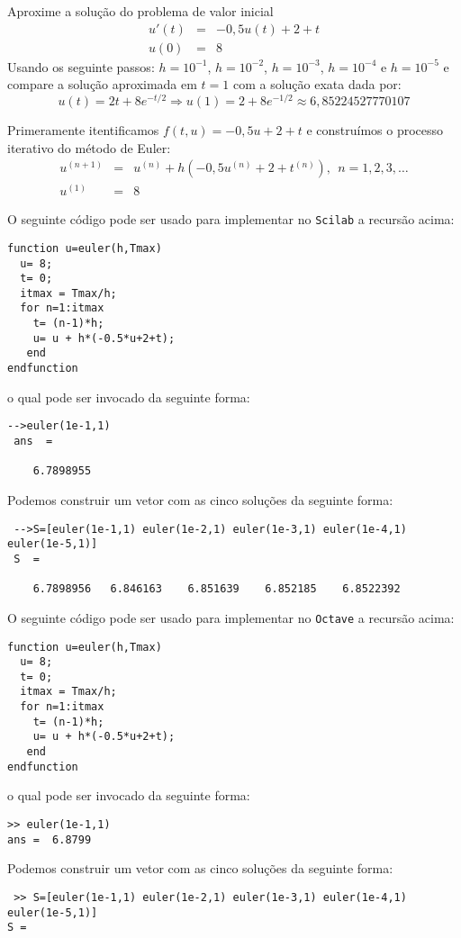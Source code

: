 \begin{exeresol}\label{pvi:exeresol1} Aproxime a solução do problema de valor inicial
\begin{eqnarray}
     u'(t)&=& -0,5u(t)+2+t\\
            u(0) &=&  8
\end{eqnarray}
Usando os seguinte passos: $h=10^{-1}$, $h=10^{-2}$, $h=10^{-3}$, $h=10^{-4}$ e $h=10^{-5}$ e compare a solução aproximada em $t=1$ com a solução exata dada por:
\begin{equation}
     u(t) = 2t+8e^{-t/2} \Longrightarrow u(1)=2+8e^{-1/2} \approx 6,85224527770107
\end{equation}
\end{exeresol}
\begin{resol} Primeramente itentificamos $f(t,u)=-0,5u+2+t$ e construímos o processo iterativo do método de Euler: 
\begin{eqnarray}
  u^{(n+1)}&=&u^{(n)} + h( -0,5u^{(n)}+2+t^{(n)}),~~n=1,2,3,\ldots\\
  u^{(1)}&=&8
\end{eqnarray}

\ifisscilab
O seguinte código pode ser usado para implementar no \verb+Scilab+ a recursão acima:
\begin{verbatim}
function u=euler(h,Tmax)
  u= 8;
  t= 0;
  itmax = Tmax/h;
  for n=1:itmax
    t= (n-1)*h;
    u= u + h*(-0.5*u+2+t);
   end
endfunction
\end{verbatim}
o qual pode ser invocado da seguinte forma:
\begin{verbatim}
-->euler(1e-1,1)
 ans  =
 
    6.7898955 
\end{verbatim}
Podemos construir um vetor com as cinco soluções da seguinte forma:
\begin{verbatim}
 -->S=[euler(1e-1,1) euler(1e-2,1) euler(1e-3,1) euler(1e-4,1) euler(1e-5,1)]
 S  =
 
    6.7898956   6.846163    6.851639    6.852185    6.8522392  
\end{verbatim}

\fi

\ifisoctave
O seguinte código pode ser usado para implementar no \verb+Octave+ a recursão acima:
\begin{verbatim}
function u=euler(h,Tmax)
  u= 8;
  t= 0;
  itmax = Tmax/h;
  for n=1:itmax
    t= (n-1)*h;
    u= u + h*(-0.5*u+2+t);
   end
endfunction
\end{verbatim}
o qual pode ser invocado da seguinte forma:
\begin{verbatim}
>> euler(1e-1,1)
ans =  6.8799
\end{verbatim}
Podemos construir um vetor com as cinco soluções da seguinte forma:
\begin{verbatim}
 >> S=[euler(1e-1,1) euler(1e-2,1) euler(1e-3,1) euler(1e-4,1) euler(1e-5,1)]
S =


\end{verbatim}
\end{resol}
